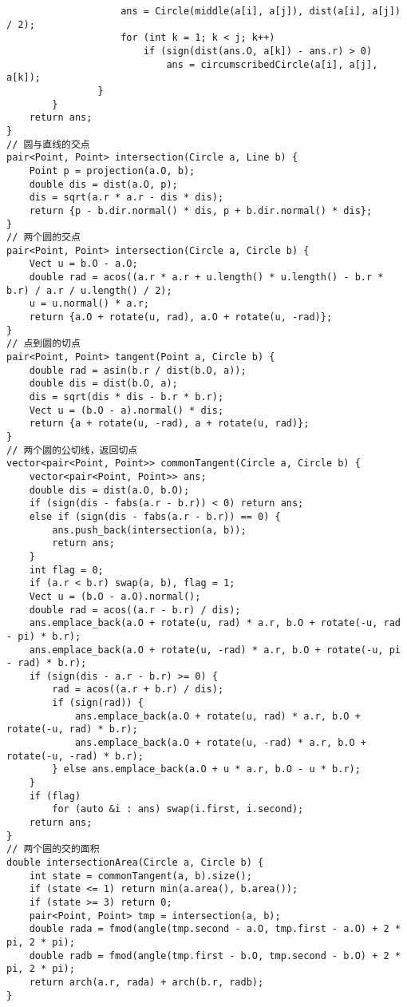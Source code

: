 \begin{verbatim}
                    ans = Circle(middle(a[i], a[j]), dist(a[i], a[j]) / 2);
                    for (int k = 1; k < j; k++)
                        if (sign(dist(ans.O, a[k]) - ans.r) > 0)
                            ans = circumscribedCircle(a[i], a[j], a[k]);
                }
        }
    return ans;
}
// 圆与直线的交点
pair<Point, Point> intersection(Circle a, Line b) {
    Point p = projection(a.O, b);
    double dis = dist(a.O, p);
    dis = sqrt(a.r * a.r - dis * dis);
    return {p - b.dir.normal() * dis, p + b.dir.normal() * dis};
}
// 两个圆的交点
pair<Point, Point> intersection(Circle a, Circle b) {
    Vect u = b.O - a.O;
    double rad = acos((a.r * a.r + u.length() * u.length() - b.r * b.r) / a.r / u.length() / 2);
    u = u.normal() * a.r;
    return {a.O + rotate(u, rad), a.O + rotate(u, -rad)};
}
// 点到圆的切点
pair<Point, Point> tangent(Point a, Circle b) {
    double rad = asin(b.r / dist(b.O, a));
    double dis = dist(b.O, a);
    dis = sqrt(dis * dis - b.r * b.r);
    Vect u = (b.O - a).normal() * dis;
    return {a + rotate(u, -rad), a + rotate(u, rad)};
}
// 两个圆的公切线，返回切点
vector<pair<Point, Point>> commonTangent(Circle a, Circle b) {
    vector<pair<Point, Point>> ans;
    double dis = dist(a.O, b.O);
    if (sign(dis - fabs(a.r - b.r)) < 0) return ans;
    else if (sign(dis - fabs(a.r - b.r)) == 0) {
        ans.push_back(intersection(a, b));
        return ans;
    }
    int flag = 0;
    if (a.r < b.r) swap(a, b), flag = 1;
    Vect u = (b.O - a.O).normal();
    double rad = acos((a.r - b.r) / dis);
    ans.emplace_back(a.O + rotate(u, rad) * a.r, b.O + rotate(-u, rad - pi) * b.r);
    ans.emplace_back(a.O + rotate(u, -rad) * a.r, b.O + rotate(-u, pi - rad) * b.r);
    if (sign(dis - a.r - b.r) >= 0) {
        rad = acos((a.r + b.r) / dis);
        if (sign(rad)) {
            ans.emplace_back(a.O + rotate(u, rad) * a.r, b.O + rotate(-u, rad) * b.r);
            ans.emplace_back(a.O + rotate(u, -rad) * a.r, b.O + rotate(-u, -rad) * b.r);
        } else ans.emplace_back(a.O + u * a.r, b.O - u * b.r);
    }
    if (flag)
        for (auto &i : ans) swap(i.first, i.second);
    return ans;
}
// 两个圆的交的面积
double intersectionArea(Circle a, Circle b) {
    int state = commonTangent(a, b).size();
    if (state <= 1) return min(a.area(), b.area());
    if (state >= 3) return 0;
    pair<Point, Point> tmp = intersection(a, b);
    double rada = fmod(angle(tmp.second - a.O, tmp.first - a.O) + 2 * pi, 2 * pi);
    double radb = fmod(angle(tmp.first - b.O, tmp.second - b.O) + 2 * pi, 2 * pi);
    return arch(a.r, rada) + arch(b.r, radb);
}
\end{verbatim}